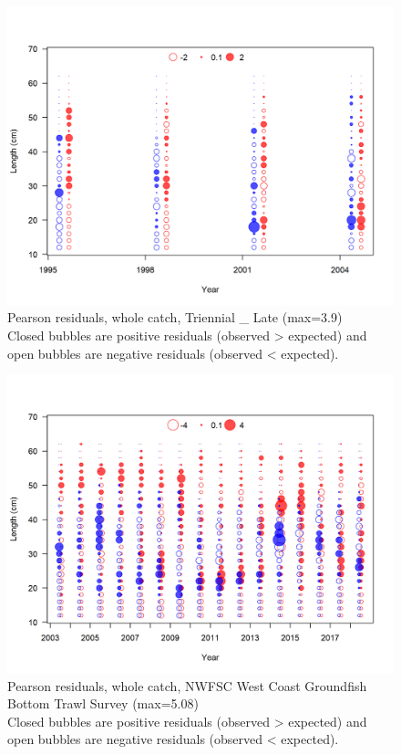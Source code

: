 \documentclass[12pt,]{article}
\begin{document}
\begin{figure}
\centering
\includegraphics{r4ss/plots_mod1/comp_lenfit_residsflt6mkt0.png}
\caption{Pearson residuals, whole catch, Triennial \_ Late (max=3.9)\\
Closed bubbles are positive residuals (observed \textgreater{} expected)
and open bubbles are negative residuals (observed \textless{} expected).
\label{fig:tri_late_len_pearson}}
\end{figure}

\begin{figure}
\centering
\includegraphics{r4ss/plots_mod1/comp_lenfit_residsflt7mkt0.png}
\caption{Pearson residuals, whole catch, NWFSC West Coast Groundfish
Bottom Trawl Survey (max=5.08)\\
Closed bubbles are positive residuals (observed \textgreater{} expected)
and open bubbles are negative residuals (observed \textless{} expected).
\label{fig:nwfsc_combo_len_pearson}}
\end{figure}
\end{document}

